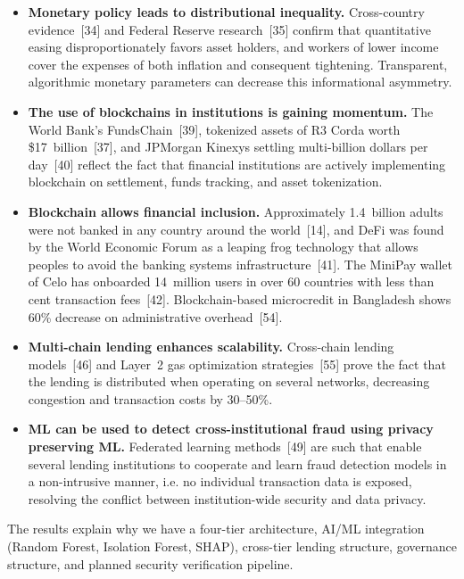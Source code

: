 \documentclass[12pt,a4paper]{report}
\begin{document}
\begin{itemize}[noitemsep]
\item \textbf{Monetary policy leads to distributional inequality.} Cross-country evidence~[34] and Federal Reserve research~[35] confirm that quantitative easing disproportionately favors asset holders, and workers of lower income cover the expenses of both inflation and consequent tightening. Transparent, algorithmic monetary parameters can decrease this informational asymmetry.
\item \textbf{The use of blockchains in institutions is gaining momentum.} The World Bank's FundsChain~[39], tokenized assets of R3 Corda worth \$17~billion~[37], and JPMorgan Kinexys settling multi-billion dollars per day~[40] reflect the fact that financial institutions are actively implementing blockchain on settlement, funds tracking, and asset tokenization.
\item \textbf{Blockchain allows financial inclusion.} Approximately 1.4~billion adults were not banked in any country around the world~[14], and DeFi was found by the World Economic Forum as a leaping frog technology that allows peoples to avoid the banking systems infrastructure~[41]. The MiniPay wallet of Celo has onboarded 14~million users in over 60 countries with less than cent transaction fees~[42]. Blockchain-based microcredit in Bangladesh shows 60\% decrease on administrative overhead~[54].
\item \textbf{Multi-chain lending enhances scalability.} Cross-chain lending models~[46] and Layer~2 gas optimization strategies~[55] prove the fact that the lending is distributed when operating on several networks, decreasing congestion and transaction costs by 30--50\%.
\item \textbf{ML can be used to detect cross-institutional fraud using privacy preserving ML.} Federated learning methods~[49] are such that enable several lending institutions to cooperate and learn fraud detection models in a non-intrusive manner, i.e. no individual transaction data is exposed, resolving the conflict between institution-wide security and data privacy.
\end{itemize}

The results explain why we have a four-tier architecture, AI/ML integration (Random Forest, Isolation Forest, SHAP), cross-tier lending structure, governance structure, and planned security verification pipeline.


\end{document}
